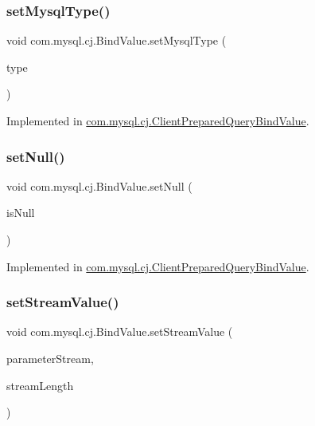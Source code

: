 \subsubsection{\texorpdfstring{set\+Mysql\+Type()}{setMysqlType()}}
{\footnotesize\ttfamily void com.\+mysql.\+cj.\+Bind\+Value.\+set\+Mysql\+Type (\begin{DoxyParamCaption}\item[{\mbox{\hyperlink{enumcom_1_1mysql_1_1cj_1_1_mysql_type}{Mysql\+Type}}}]{type }\end{DoxyParamCaption})}



Implemented in \mbox{\hyperlink{classcom_1_1mysql_1_1cj_1_1_client_prepared_query_bind_value_a454d8f5fab8fd48d421a4678ad4aff40}{com.\+mysql.\+cj.\+Client\+Prepared\+Query\+Bind\+Value}}.

\mbox{\label{interfacecom_1_1mysql_1_1cj_1_1_bind_value_a0f9adcc47481b3e041fe5cfb8f18818c}} 
\subsubsection{\texorpdfstring{set\+Null()}{setNull()}}
{\footnotesize\ttfamily void com.\+mysql.\+cj.\+Bind\+Value.\+set\+Null (\begin{DoxyParamCaption}\item[{boolean}]{is\+Null }\end{DoxyParamCaption})}



Implemented in \mbox{\hyperlink{classcom_1_1mysql_1_1cj_1_1_client_prepared_query_bind_value_a72bd20bab00cb3b893e7f76fb64b74fd}{com.\+mysql.\+cj.\+Client\+Prepared\+Query\+Bind\+Value}}.

\mbox{\label{interfacecom_1_1mysql_1_1cj_1_1_bind_value_aae317c620c8bbcaca76be87eacaa5533}} 
\subsubsection{\texorpdfstring{set\+Stream\+Value()}{setStreamValue()}}
{\footnotesize\ttfamily void com.\+mysql.\+cj.\+Bind\+Value.\+set\+Stream\+Value (\begin{DoxyParamCaption}\item[{Input\+Stream}]{parameter\+Stream,  }\item[{int}]{stream\+Length }\end{DoxyParamCaption})}



